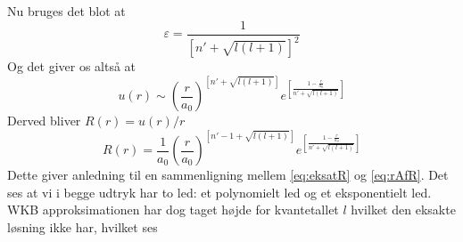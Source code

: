 Nu bruges det blot at
\begin{equation}
  \varepsilon = \frac{1}{\left[n'+\sqrt{l(l+1)}\right]^2}
\end{equation}
Og det giver os altså at
\begin{equation}
  u(r) \sim {\left(\frac{r}{a_0}\right)}^{\left[n'+\sqrt{l(l+1)}\right]} e^{\left[\frac{1-\frac{r}{a_0}}{n'+\sqrt{l(l+1)}}\right]}
\end{equation}
Derved bliver $R(r) = u(r)/r$
\begin{equation}
  R(r) = \frac{1}{a_0}{\left(\frac{r}{a_0}\right)}^{\left[n'-1+\sqrt{l(l+1)}\right]} e^{\left[\frac{1-\frac{r}{a_0}}{n'+\sqrt{l(l+1)}}\right]}
  \label{eq:rAfR}
\end{equation}
Dette giver anledning til en sammenligning mellem \cref{eq:eksatR} og \cref{eq:rAfR}. Det ses at vi i begge udtryk har to led: et polynomielt led og et eksponentielt led. WKB approksimationen har dog taget højde for kvantetallet $l$ hvilket den eksakte løsning ikke har, hvilket ses

